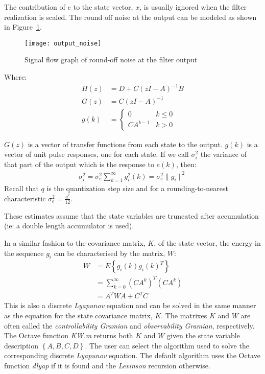 \documentclass[a4paper,twoside,10pt,english]{report}
\begin{document}
The contribution of $e$ to the state vector, $x$, is usually ignored when the
filter realization is scaled. The round off noise at the output can be modeled 
as shown in Figure~\ref{fig:Output-noise}.
\begin{figure}[!htbp]
\begin{center}
\texttt{[image: output\_noise]}
\caption{Signal flow graph of round-off noise at the filter output}
\label{fig:Output-noise}
\end{center}
\end{figure}
Where:
\begin{align*}
H\left(z\right)&=D+C\left(zI-A\right)^{-1}B\\
G\left(z\right)&=C\left(zI-A\right)^{-1}\\
g\left(k\right)&=\begin{cases}
0 & k\le0\\
CA^{k-1} & k>0
\end{cases}
\end{align*}

$G\left(z\right)$ is a vector of transfer functions from each state to the
output. $g\left(k\right)$ is a vector of unit pulse responses, one for each 
state. If we call $\sigma_{i}^{2}$ the variance of that part of the output
which is the response to $e\left(k\right)$, then:
\begin{align*}
\sigma_{i}^{2}=\sigma_{e}^{2}\sum^{\infty}_{k=1}g_{i}^{2}\left(k\right)
=\sigma_{e}^{2}\|g_{i}\|^{2}
\end{align*}
Recall that $q$ is the quantization step size and for a rounding-to-nearest
characteristic $\sigma_{e}^{2}=\frac{q^{2}}{12}$.

These estimates assume that the state variables are truncated
after accumulation (ie: a double length accumulator is used).

In a similar fashion to the covariance matrix, $K$, of the state vector, the 
energy in the sequence $g_{i}$ can be characterised by the matrix, $W$:
\begin{align*}
W &= E\left\{g_{i}\left(k\right)g_{i}\left(k\right)^{T}\right\}\\
  &= \sum^{\infty}_{k=0}\left(CA^{k}\right)^{T}\left(CA^{k}\right)\\
  &=A^{T}WA+C^{T}C
\end{align*}
This is also a discrete \emph{Lyapunov} equation and can be solved in the
same manner as the equation for the state covariance matrix, $K$. The matrixes
$K$ and $W$ are often called the \emph{controllability Gramian} 
and \emph{observability Gramian}, respectively. The Octave function \emph{KW.m}
returns both $K$ and $W$ given the state variable description 
$\left\{A,B,C,D\right\}$. The user can select the algorithm used to solve the 
corresponding discrete \emph{Lyapunov} equation. The default algorithm uses the 
Octave function \emph{dlyap} if it is found and the \emph{Levinson} recursion
otherwise.
\end{document}
